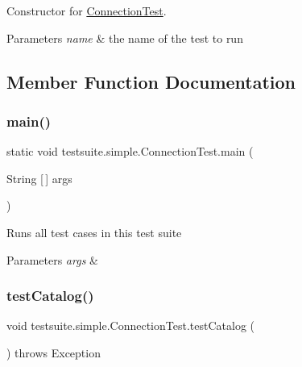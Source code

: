 Constructor for \mbox{\hyperlink{classtestsuite_1_1simple_1_1_connection_test}{Connection\+Test}}.


\begin{DoxyParams}{Parameters}
{\em name} & the name of the test to run \\
\hline
\end{DoxyParams}


\subsection{Member Function Documentation}
\mbox{\label{classtestsuite_1_1simple_1_1_connection_test_a3f457b435e6cf75f31649400f2ce211d}} 
\subsubsection{\texorpdfstring{main()}{main()}}
{\footnotesize\ttfamily static void testsuite.\+simple.\+Connection\+Test.\+main (\begin{DoxyParamCaption}\item[{String \mbox{[}$\,$\mbox{]}}]{args }\end{DoxyParamCaption})\hspace{0.3cm}{\ttfamily [static]}}

Runs all test cases in this test suite


\begin{DoxyParams}{Parameters}
{\em args} & \\
\hline
\end{DoxyParams}
\mbox{\label{classtestsuite_1_1simple_1_1_connection_test_a272c1a4280b551be2feb88f3995878b0}} 
\subsubsection{\texorpdfstring{test\+Catalog()}{testCatalog()}}
{\footnotesize\ttfamily void testsuite.\+simple.\+Connection\+Test.\+test\+Catalog (\begin{DoxyParamCaption}{ }\end{DoxyParamCaption}) throws Exception}

